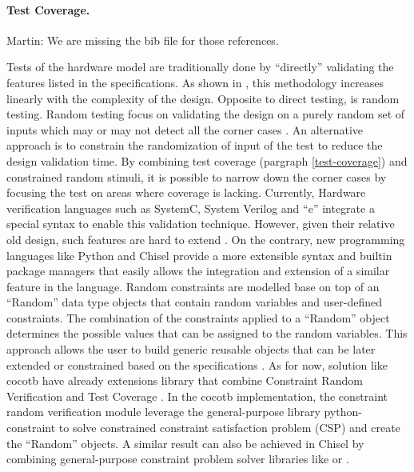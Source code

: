 \documentclass[conference]{IEEEtran}
\newcommand{\martin}[1]{{\color{blue} Martin: #1}}
\begin{document}
\paragraph{Test Coverage.} %

\martin{We are missing the bib file for those references.}

Tests of the hardware model are traditionally done by ``directly'' validating the features listed in the specifications. As shown in \cite{spear2008systemverilog}, this methodology increases linearly with the complexity of the design. Opposite to direct testing, is random testing. Random testing focus on validating the design on a purely random set of inputs which may or may not detect all the corner cases \cite{mehta2017a}. An alternative approach is to constrain the randomization of input of the test to reduce the design validation time. By combining test coverage (pargraph \ref{test-coverage}) and constrained random stimuli, it is possible to narrow down the corner cases by focusing the test on areas where coverage is lacking. Currently, Hardware verification languages such as SystemC, System Verilog and ``e'' integrate a special syntax to enable this validation technique. However, given their relative old design, such features are hard to extend \cite{haedicke2012crave} \cite{le2015boosting}. On the contrary, new programming languages like Python and Chisel provide a more extensible syntax and builtin package managers that easily allows the integration and extension of a similar feature in the language. Random constraints are modelled base on top of an ``Random'' data type objects that contain random variables and user-defined constraints.  The combination of the constraints applied to a ``Random'' object determines the possible values that can be assigned to the random variables. This approach allows the user to build generic reusable objects that can be later extended or constrained based on the specifications \cite{cieplucha2016new}\cite{mehta2017a}. As for now, solution like cocotb \cite{rosser2018cocotb}\cite{cocotb2020Sep} have already extensions library that combine Constraint Random Verification and Test Coverage \cite{mciepluc2020Sep}. In the cocotb implementation, the constraint random verification module leverage the general-purpose library python-constraint \cite{python-constraint2020Sep} to solve constrained constraint satisfaction problem (CSP) and create the ``Random'' objects. A similar result can also be achieved in Chisel by combining general-purpose constraint problem solver libraries like \cite{chocoteam2020Sep} or \cite{BibEntry2020Sep}.
\end{document}

